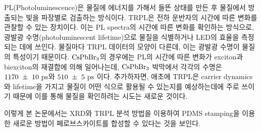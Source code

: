PL(Photoluminescence)은 물질에 에너지를 가해서 들뜬 상태를 만든 후 물질에서 방출되는 빛을 파장별로 검출하는 방식이다. TRPL은 전하 운반자의 시간에 따른 변화를 관찰할 수 있는 장치이다. 이는 PL spectra의 시간에 따른 변화를 확인하는 방식으로, 광발광 수명(photoluminescent lifetime)으로 물질을 식별하거나 LED의 효율을 측정되는 데에 쓰인다. 물질마다 TRPL 데이터의 모양이 다른데, 이는 광발광 수명이 물질의 특성이기 때문이다. $\rm{CsPbBr_3}$의 경우에는 PL의 시간에 따른 변화가 exciton과 biexciton의 재결합에 의해 일어나는데, $\rm{CsPbBr_3}$ 박막에서 각각의 수명은 $\rm{1170~\pm~10~ps}$와 $\rm{510~\pm~5~ps}$ 이다\cite{chen2018room}. 추가하자면, 애초에 TRPL은 carrier dynamics와 lifetime을 가지고 물질이 어떤 식으로 활용될 수 있는지를 예상하는데에 주로 쓰이기 때문에 이를 통해 물질을 확인하려는 시도는 새로운 것이다. 

이렇게 본 논문에서는 XRD와 TRPL 분석 방법을 이용하여 PDMS stamping을 이용한 새로운 방법이 페로브스카이트를 합성할 수 있다는 것을 보인다.

